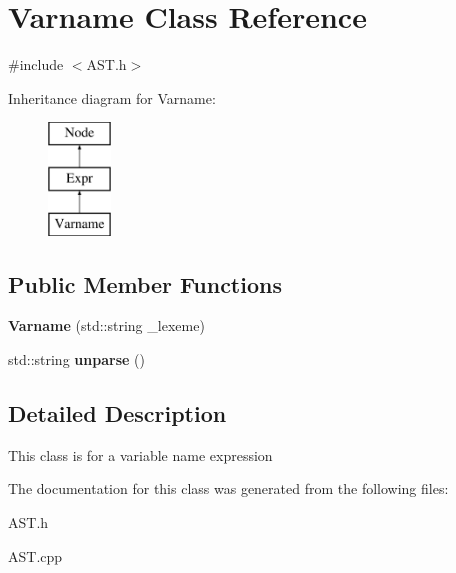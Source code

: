 \hypertarget{classVarname}{\section{Varname Class Reference}
\label{classVarname}
}


{\ttfamily \#include $<$A\-S\-T.\-h$>$}

Inheritance diagram for Varname\-:\begin{figure}[H]
\begin{center}
\leavevmode
\includegraphics[height=3.000000cm]{classVarname}
\end{center}
\end{figure}
\subsection*{Public Member Functions}
\begin{DoxyCompactItemize}
\item 
\hypertarget{classVarname_a717889d6da22e437f71468c26eedd79d}{{\bfseries Varname} (std\-::string \-\_\-lexeme)}\label{classVarname_a717889d6da22e437f71468c26eedd79d}

\item 
\hypertarget{classVarname_a88ccb6c2760c23a28be071d6b7fe0496}{std\-::string {\bfseries unparse} ()}\label{classVarname_a88ccb6c2760c23a28be071d6b7fe0496}

\end{DoxyCompactItemize}


\subsection{Detailed Description}
This class is for a variable name expression 

The documentation for this class was generated from the following files\-:\begin{DoxyCompactItemize}
\item 
A\-S\-T.\-h\item 
A\-S\-T.\-cpp\end{DoxyCompactItemize}
